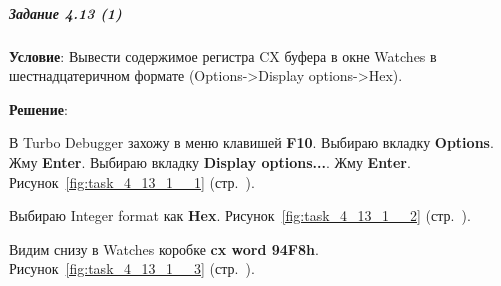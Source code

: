 \subparagraph{Задание 4.13 (1)}

\textbf{Условие}: Вывести содержимое регистра CX буфера в окне Watches в шестнадцатеричном формате (Options->Display options->Hex).

\textbf{Решение}:

В Turbo Debugger захожу в меню клавишей \textbf{F10}. Выбираю вкладку \textbf{Options}. Жму \textbf{Enter}. Выбираю вкладку \textbf{Display options...}. Жму \textbf{Enter}.
Рисунок~\ref{fig:task_4_13_1__1} (стр.~\pageref{fig:task_4_13_1__1}).

Выбираю Integer format как \textbf{Hex}.
Рисунок~\ref{fig:task_4_13_1__2} (стр.~\pageref{fig:task_4_13_1__2}).

Видим снизу в Watches коробке \textbf{cx word 94F8h}.
Рисунок~\ref{fig:task_4_13_1__3} (стр.~\pageref{fig:task_4_13_1__3}).

